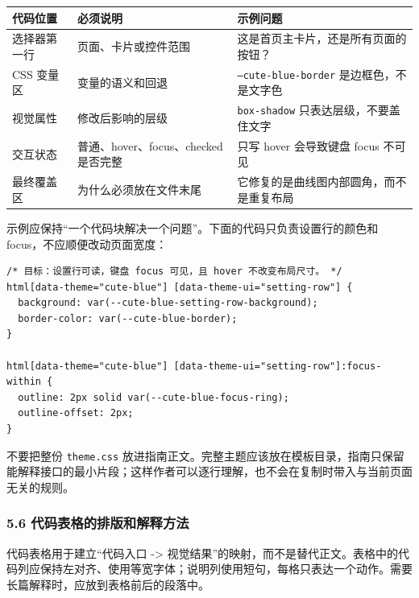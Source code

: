 \documentclass[UTF8,11pt,a4paper]{ctexart}
\newenvironment{Shaded}{\begin{snugshade}}{\end{snugshade}}
\begin{document}
\begin{longtable}[]{@{}L{0.20\textwidth}L{0.34\textwidth}L{0.40\textwidth}@{}}
\toprule\noalign{}
代码位置 & 必须说明 & 示例问题 \\
\midrule\noalign{}
\endhead
\bottomrule\noalign{}
\endlastfoot
选择器第一行 & 页面、卡片或控件范围 & 这是首页主卡片，还是所有页面的按钮？ \\
CSS 变量区 & 变量的语义和回退 & \texttt{--cute-blue-border} 是边框色，不是文字色 \\
视觉属性 & 修改后影响的层级 & \texttt{box-shadow} 只表达层级，不要盖住文字 \\
交互状态 & 普通、hover、focus、checked 是否完整 & 只写 hover 会导致键盘 focus 不可见 \\
最终覆盖区 & 为什么必须放在文件末尾 & 它修复的是曲线图内部圆角，而不是重复布局 \\
\end{longtable}

示例应保持“一个代码块解决一个问题”。下面的代码只负责设置行的颜色和 focus，不应顺便改动页面宽度：

\begin{Shaded}
\begin{Verbatim}[breaklines=true,breakanywhere=true,fontsize=\small,baselinestretch=1.15]
/* 目标：设置行可读，键盘 focus 可见，且 hover 不改变布局尺寸。 */
html[data-theme="cute-blue"] [data-theme-ui="setting-row"] {
  background: var(--cute-blue-setting-row-background);
  border-color: var(--cute-blue-border);
}

html[data-theme="cute-blue"] [data-theme-ui="setting-row"]:focus-within {
  outline: 2px solid var(--cute-blue-focus-ring);
  outline-offset: 2px;
}
\end{Verbatim}
\end{Shaded}

不要把整份 \texttt{theme.css} 放进指南正文。完整主题应该放在模板目录，指南只保留能解释接口的最小片段；这样作者可以逐行理解，也不会在复制时带入与当前页面无关的规则。

\subsubsection{5.6 代码表格的排版和解释方法}

代码表格用于建立“代码入口 -> 视觉结果”的映射，而不是替代正文。表格中的代码列应保持左对齐、使用等宽字体；说明列使用短句，每格只表达一个动作。需要长篇解释时，应放到表格前后的段落中。
\end{document}
